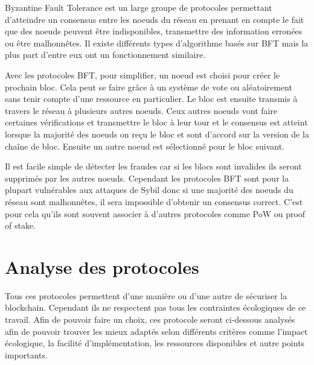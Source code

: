 Byzantine Fault Tolerance est un large groupe de protocoles permettant d'atteindre un consensus entre les noeuds du réseau en prenant en compte le fait que des noeuds peuvent être indisponibles, transmettre des information erronées ou être malhonnêtes. Il existe différents types d'algorithme basés sur BFT mais la plus part d'entre eux ont un fonctionnement similaire. 

Avec les protocoles BFT, pour simplifier, un noeud est choisi pour créer le prochain bloc. Cela peut se faire grâce à un système de vote ou aléatoirement sans tenir compte d'une ressource en particulier. Le bloc est ensuite transmis à travers le réseau à plusieurs autres noeuds. Ceux autres noeuds vont faire certaines vérifications et transmettre le bloc à leur tour et le consensus est atteint lorsque la majorité des noeuds on reçu le bloc et sont d'accord sur la version de la chaîne de bloc. Ensuite un autre noeud est sélectionné pour le bloc suivant.

Il est facile simple de détecter les fraudes car si les blocs sont invalides ils seront supprimés par les autres noeuds. Cependant les protocoles BFT sont pour la plupart vulnérables aux attaques de Sybil donc si une majorité des noeuds du réseau sont malhonnêtes, il sera impossible d'obtenir un consensus correct. C'est pour cela qu'ils sont souvent associer à d'autres protocoles comme PoW ou proof of stake.

\section{Analyse des protocoles}

Tous ces protocoles permettent d'une manière ou d'une autre de sécuriser la blockchain. Cependant ils ne respectent pas tous les contraintes écologiques de ce travail. Afin de pouvoir faire un choix, ces protocole seront ci-dessous analysés afin de pouvoir trouver les mieux adaptés selon différents critères comme l'impact écologique, la facilité d'implémentation, les ressources disponibles et autre points importants.

